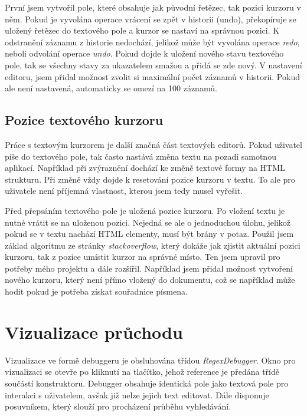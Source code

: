 První jsem vytvořil pole, které obsahuje jak původní řetězec, tak pozici kurzoru v něm.
Pokud je vyvolána operace vrácení se zpět v historii (undo), překopíruje se uložený řetězec do textového pole a kurzor se nastaví na správnou pozici.
K odstranění záznamu z historie nedochází, jelikož může být vyvolána operace \textit{redo}, neboli odvolání operace \textit{undo}.
Pokud dojde k uložení nového stavu textového pole, tak se všechny stavy za ukazatelem smažou a přidá se zde nový.
V nastavení editoru, jsem přidal možnost zvolit si maximální počet záznamů v historii.
Pokud ale není nastavená, automaticky se omezí na 100 záznamů.

\subsection*{Pozice textového kurzoru}
Práce s textovým kurzorem je další značná část textových editorů.
Pokud uživatel píše do textového pole, tak často nastává změna textu na pozadí samotnou aplikací.
Například při zvýraznění dochází ke změně textové formy na HTML strukturu.
Při změně vždy dojde k resetování pozice kurzoru v textu.
To ale pro uživatele není příjemná vlastnost, kterou jsem tedy musel vyřešit.

Před přepsáním textového pole je uložená pozice kurzoru.
Po vložení textu je nutné vrátit se na uloženou pozici. 
Nejedná se ale o jednoduchou úlohu, jelikož pokud se v textu nachází HTML elementy, musí být brány v potaz.
Použil jsem základ algoritmu ze stránky \textit{stackoverflow}\cite{the_Hutt_2022}, který dokáže jak zjistit aktuální pozici kurzoru, tak z pozice umístit kurzor na správné místo.
Ten jsem upravil pro potřeby mého projektu a dále rozšířil.
Například jsem přidal možnost vytvoření nového kurzoru, který není přímo vložený do dokumentu, což se například může hodit pokud je potřeba získat souřadnice písmena.

\section{Vizualizace průchodu}

Vizualizace ve formě debuggeru je obsluhována třídou \textit{RegexDebugger}.
Okno pro vizualizaci se otevře po kliknutí na tlačítko, jehož reference je předána třídě součástí konstruktoru.
Debugger obsahuje identická pole jako textová pole pro interakci s uživatelem, avšak již nelze jejich text editovat.
Dále disponuje posuvníkem, který slouží pro procházení průběhu vyhledávání. 

